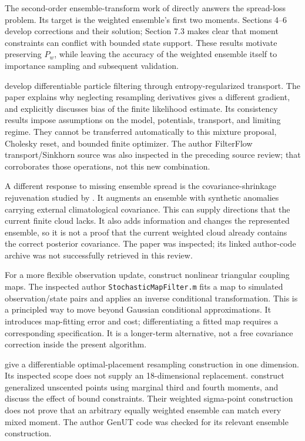 \documentclass[11pt,a4paper]{article}
\begin{document}
The second-order ensemble-transform work of \citet{acevedo2017} directly
answers the spread-loss problem. Its target is the weighted ensemble's
first two moments. Sections 4--6 develop corrections and their solution;
Section 7.3 makes clear that moment constraints can conflict with bounded
state support. These results motivate preserving \(P_w\), while leaving
the accuracy of the weighted ensemble itself to importance sampling and
subsequent validation.

\citet[Algorithm 3, Section 4 and Proposition 4.3]{corenflos2021} develop
differentiable particle filtering through entropy-regularized transport.
The paper explains why neglecting resampling derivatives gives a different
gradient, and explicitly discusses bias of the finite likelihood estimate.
Its consistency results impose assumptions on the model, potentials,
transport, and limiting regime. They cannot be transferred automatically
to this mixture proposal, Cholesky reset, and bounded finite optimizer.
The author FilterFlow transport/Sinkhorn source was also inspected in the
preceding source review; that corroborates those operations, not this new
combination.

A different response to missing ensemble spread is the covariance-shrinkage
rejuvenation studied by \citet[Sections 4--6]{popov2022}. It augments an
ensemble with synthetic anomalies carrying external climatological covariance.
This can supply directions that the current finite cloud lacks. It also adds
information and changes the represented ensemble, so it is not a proof that
the current weighted cloud already contains the correct posterior covariance.
The paper was inspected; its linked author-code archive was not successfully
retrieved in this review.

For a more flexible observation update, \citet[Sections 3.3, 3.7 and
Appendix A]{spantini2022} construct nonlinear triangular coupling maps.
The inspected author \texttt{StochasticMapFilter.m} fits a map to simulated
observation/state pairs and applies an inverse conditional transformation.
This is a principled way to move beyond Gaussian conditional approximations.
It introduces map-fitting error and cost; differentiating a fitted map
requires a corresponding specification. It is a longer-term alternative,
not a free covariance correction inside the present algorithm.

\citet[Sections III--V]{csuzdi2024} give a differentiable
optimal-placement resampling construction in one dimension.
Its inspected scope does not supply an 18-dimensional replacement.
\citet[Sections IV--V]{ebeigbe2025} construct generalized unscented points
using marginal third and fourth moments, and discuss the effect of bound
constraints. Their weighted sigma-point construction does not prove that
an arbitrary equally weighted ensemble can match every mixed moment.
The author GenUT code was checked for its relevant ensemble construction.
\end{document}
